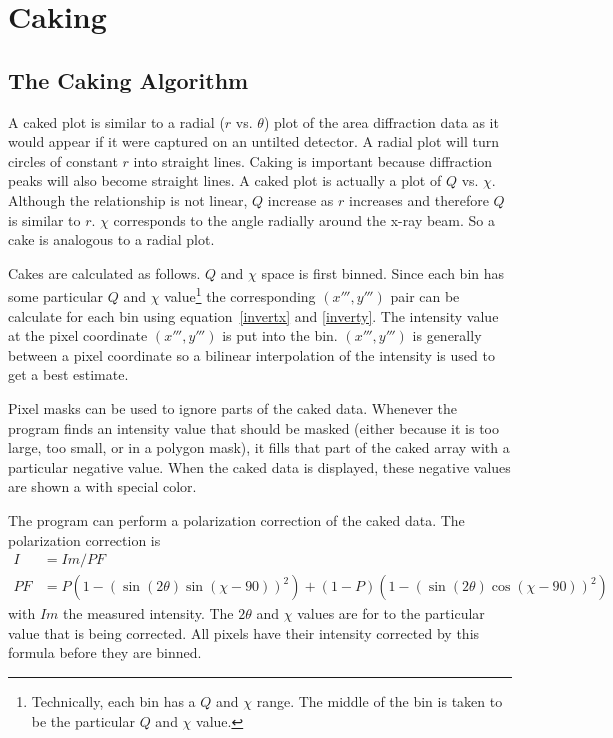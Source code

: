\chapter{Caking}\label{Caking}

\section{The Caking Algorithm}

A caked plot is similar to a radial ($r$ vs. $\theta$) plot 
of the area diffraction data as it would appear if it were
captured on an untilted detector. A radial plot will turn
circles of constant $r$ into straight lines.
Caking is important because diffraction peaks will 
also become straight lines. A caked plot is actually a 
plot of $Q$ vs. $\chi$. 
Although the relationship is not linear, $Q$ increase as $r$ 
increases and therefore $Q$ is similar to $r$.
$\chi$ corresponds to the angle radially around the x-ray
beam. So a cake is analogous to a radial 
plot.

Cakes are calculated as follows.
$Q$ and $\chi$ space is first binned. Since each bin has 
some particular $Q$ and $\chi$ value\footnote{Technically,
each bin has a $Q$ and $\chi$ range. The middle of the bin 
is taken to be the particular $Q$ and $\chi$ value.} 
the corresponding $(x''',y''')$ pair can be calculate for each
bin using equation~\ref{invertx} and \ref{inverty}. The
intensity value at the pixel coordinate $(x''',y''')$
is put into the bin.
$(x''',y''')$ is generally between a pixel coordinate so
a bilinear interpolation of the intensity is used to
get a best estimate.

Pixel masks can be used to ignore parts of the caked data.
Whenever the program finds an intensity value
that should be masked (either because it is too 
large, too small, or in a polygon mask), it fills
that part of the caked array with a particular 
negative value. When the caked data is displayed,
these negative values are shown a with special color.

The program can perform a polarization correction of
the caked data. The polarization 
correction is
\begin{align}
    I&=Im/PF \\ 
    PF&=P(1 - (\sin(2\theta)\sin(\chi-90))^2) + 
    (1 - P)(1 - (\sin(2\theta)\cos(\chi-90))^2)
\end{align}
with $Im$ the measured intensity. The $2\theta$ and $\chi$
values are for to the particular value that is being 
corrected. All pixels have their 
intensity corrected by this formula before they
are binned.

